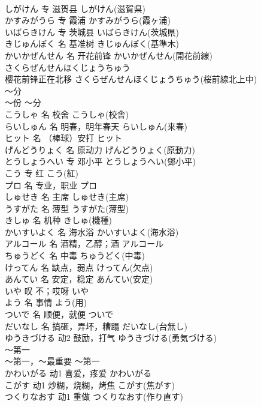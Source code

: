 \documentclass[8pt]{extreport}
\begin{document}
\begin{CJK}{UTF8}{min}
\\	しがけん	专	滋贺县	しがけん(滋賀県)	
\\	かすみがうら	专	霞浦	かすみがうら(霞ヶ浦)	
\\	いばらきけん	专	茨城县	いばらきけん(茨城県)	
\\	きじゅんぼく	名	基准树	きじゅんぼく(基準木)	
\\	かいかぜんせん	名	开花前锋	かいかぜんせん(開花前線)	
\\	さくらぜんせんほくじょうちゅう	
\\	樱花前锋正在北移	さくらぜんせんほくじょうちゅう(桜前線北上中)	
\\	～分	
\\	～份	～分	
\\	こうしゃ	名	校舍	こうしゃ(校舎)	
\\	らいしゅん	名	明春，明年春天	らいしゅん(来春)	
\\	ヒット	名	（棒球）安打	ヒット	
\\	げんどうりょく	名	原动力	げんどうりょく(原動力)	
\\	とうしょうへい	专	邓小平	とうしょうへい(鄧小平)	
\\	こう	专	红	こう(紅)	
\\	プロ	名	专业，职业	プロ	
\\	しゅせき	名	主席	しゅせき(主席)	
\\	うすがた	名	薄型	うすがた(薄型)	
\\	きしゅ	名	机种	きしゅ(機種)	
\\	かいすいよく	名	海水浴	かいすいよく(海水浴)	
\\	アルコール	名	酒精，乙醇；酒	アルコール	
\\	ちゅうどく	名	中毒	ちゅうどく(中毒)	
\\	けってん	名	缺点，弱点	けってん(欠点)	
\\	あんてい	名	安定，稳定	あんてい(安定)	
\\	いや	叹	不；哎呀	いや	
\\	よう	名	事情	よう(用)	
\\	ついで	名	顺便，就便	ついで	
\\	だいなし	名	搞砸，弄坏，糟蹋	だいなし(台無し)	
\\	ゆうきづける	动2	鼓励，打气	ゆうきづける(勇気づける)	
\\	～第一	
\\	～第一，～最重要	～第一	
\\	かわいがる	动1	喜爱，疼爱	かわいがる	
\\	こがす	动1	炒糊，烧糊，烤焦	こがす(焦がす)	
\\	つくりなおす	动1	重做	つくりなおす(作り直す)	

\end{CJK}
\end{document}
